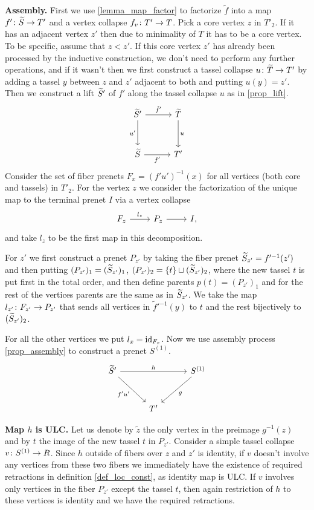 \documentclass[letterpaper,12pt,leqno]{article}
\numberwithin{equation}{theorem}
\begin{document}
{\bf Assembly.}
First we use \ref{lemma_map_factor} to factorize $\tilde f$ into a map $f'\colon \widetilde S \to T'$ and a vertex collapse $f_v \colon T' \to T$.
Pick a core vertex $z$ in $T'_2$. If it has an adjacent vertex $z'$ then due to minimality of $T$ it has to be a core vertex.
To be specific, assume that $z < z'$. If this core vertex $z'$ has already been processed by the inductive construction, we don't need to perform any further operations,
and if it wasn't then we first construct a tassel collapse $u\colon\widetilde T \to T'$ by adding a tassel $y$ between $z$ and $z'$ adjacent to both and putting $u(y) = z'$.
Then we construct a lift $\widetilde S'$ of $f'$ along the tassel collapse $u$ as in \ref{prop_lift}.
$$
\begin{tikzcd}[sep=3em]
\wtilde S' \ar[d, "u'"'] \ar[r, "\tilde f'"] & \wtilde T \ar[d, "u"] \\
\wtilde S \ar[r, "f'"'] & T'
\end{tikzcd}
$$
Consider the set of fiber prenets $F_x = (f'u')^{-1}(x)$ for all vertices (both core and tassels) in $T'_2$. For the vertex $z$ we consider the factorization of the unique map
to the terminal prenet $I$ via a vertex collapse
$$
\begin{tikzcd}
F_z \ar[r, "l_z"] & P_z \ar[r] & I,
\end{tikzcd}
$$
and take $l_z$ to be the first map in this decomposition.

For $z'$ we first construct a prenet $P_{z'}$ by taking the fiber prenet $\widetilde S_{z'} = f'^{-1}(z')$ and then putting $(P_{z'})_1 = (\widetilde S_{z'})_1$,
$(P_{z'})_2 = \{t\} \sqcup (\widetilde S_{z'})_2$, where the new tassel $t$ is put first in the total order, and then define parents $p(t) = (P_{z'})_1$ and for the
rest of the vertices parents are the same as in $\widetilde S_{z'}$. We take the map $l_{z'}\colon F_{z'} \to P_{z'}$ that sends all vertices in $\tilde f'^{-1}(y)$ to $t$
and the rest bijectively to $(\widetilde S_{z'})_2$.

For all the other vertices we put $l_x = \mathrm{id}_{F_x}$. Now we use assembly process \ref{prop_assembly} to construct a prenet $S^{(1)}$.
$$
\begin{tikzcd}[sep=3em]
\wtilde S' \ar[dr, "f'u'"'] \ar[rr, "h"] && S^{(1)} \ar[dl, "g"] \\
& T' &
\end{tikzcd}
$$

{\bf Map $h$ is ULC.} Let us denote by $\tilde z$ the only vertex in the preimage $g^{-1}(z)$ and by $t$ the image of the new tassel $t$ in $P_{z'}$.
Consider a simple tassel collapse $v\colon S^{(1)} \to R$. Since $h$ outside of fibers over $z$ and $z'$ is identity, if $v$ doesn't involve any vertices from these two
fibers we immediately have the existence of required retractions in definition \ref{def_loc_const}, as identity map is ULC. If $v$ involves only vertices in the fiber $P_{z'}$ except the tassel $t$,
then again restriction of $h$ to these vertices is identity and we have the required retractions.
\end{document}
